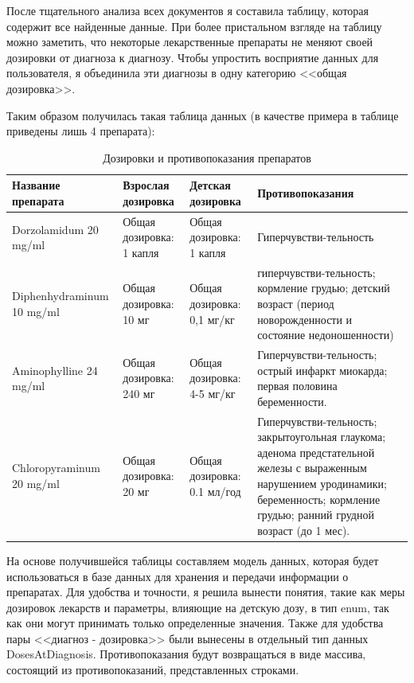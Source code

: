 После тщательного анализа всех документов я составила таблицу, которая содержит все найденные данные. При более пристальном взгляде на таблицу можно заметить, что некоторые лекарственные препараты не меняют своей дозировки от диагноза к диагнозу. Чтобы упростить восприятие данных для пользователя, я объединила эти диагнозы в одну категорию <<общая дозировка>>.

Таким образом получилась такая таблица данных (в качестве примера в таблице приведены лишь 4 препарата):

\begin{table}    
    \caption{Дозировки и противопоказания препаратов}
        \begin{tabularx}{\textwidth}{|X|X|X|X|}\hline
            Название препарата      & Взрослая дозировка & Детская дозировка  & Противопоказания  \\ \hline
            Dorzolamidum 20 mg/ml  & Общая дозировка: 1 капля   & Общая дозировка: 1 капля  & Гиперчувстви-тельность \\ \hline
            Diphenhydraminum 10 mg/ml       & Общая дозировка: 10 мг   & Общая дозировка: 0,1 мг/кг    & гиперчувстви-тельность; кормление грудью; детский возраст (период новорожденности и состояние недоношенности)\\ \hline
            Aminophylline 24 mg/ml    & Общая дозировка: 240 мг   & Общая дозировка: 4-5 мг/кг    & Гиперчувстви-тельность;
            острый инфаркт миокарда;
            первая половина беременности.   \\ \hline
            Chloropyraminum 20 mg/ml  & Общая дозировка: 20 мг  & Общая дозировка: 0.1 мл/год   & Гиперчувстви-тельность;
            закрытоугольная глаукома;
            аденома предстательной железы с выраженным нарушением уродинамики;
            беременность;
            кормление грудью;
            ранний грудной возраст (до 1 мес).  \\ \hline
        \end{tabularx}
    \label{tab:tab2}
\end{table}




На основе получившейся таблицы составляем модель данных, которая будет использоваться в базе данных для хранения и передачи информации о препаратах. Для удобства и точности, я решила вынести понятия, такие как меры дозировок лекарств и параметры, влияющие на детскую дозу, в тип enum, так как они могут принимать только определенные значения. Также для удобства пары <<диагноз - дозировка>> были вынесены в отдельный тип данных DosesAtDiagnosis. Противопоказания будут возвращаться в виде массива, состоящий из противопоказаний, представленных строками.

